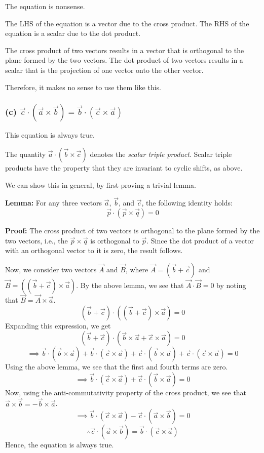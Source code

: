 The equation is nonsense.

The LHS of the equation is a vector due to the cross product.
The RHS of the equation is a scalar due to the dot product.

The cross product of two vectors results in a vector that is orthogonal to the plane formed by the two vectors.
The dot product of two vectors results in a scalar that is the projection of one vector onto the other vector.

Therefore, it makes no sense to use them like this.

\subsubsection*{(c) \( \vec{c} \cdot (\vec{a} \times \vec{b}) = \vec{b} \cdot (\vec{c} \times \vec{a}) \)}

This equation is always true.

The quantity \( \vec{a} \cdot (\vec{b} \times \vec{c}) \) denotes the \textit{scalar triple product}.
Scalar triple products have the property that they are invariant to cyclic shifts, as above.

We can show this in general, by first proving a trivial lemma.

\textbf{Lemma:} For any three vectors \( \vec{a} \), \( \vec{b} \), and \( \vec{c} \), the following identity holds:
\begin{equation*}
    \vec{p} \cdot (\vec{p} \times \vec{q}) = 0
\end{equation*}

\textbf{Proof:}
The cross product of two vectors is orthogonal to the plane formed by the two vectors, i.e., the \( \vec{p} \times \vec{q} \) is orthogonal to \( \vec{p} \).
Since the dot product of a vector with an orthogonal vector to it is zero, the result follows.

Now, we consider two vectors \( \vec{A} \) and \( \vec{B} \), where \( \vec{A} = (\vec{b} + \vec{c}) \) and \( \vec{B} = ((\vec{b} + \vec{c}) \times \vec{a}) \).
By the above lemma, we see that \( \vec{A} \cdot \vec{B} = 0 \) by noting that \( \vec{B} = \vec{A} \times \vec{a} \).
\begin{equation*}
    (\vec{b} + \vec{c}) \cdot ((\vec{b} + \vec{c}) \times \vec{a}) = 0
\end{equation*}
Expanding this expression, we get
\[
    (\vec{b} + \vec{c}) \cdot (\vec{b} \times \vec{a} + \vec{c} \times \vec{a}) = 0
\]
\[
    \implies \vec{b} \cdot (\vec{b} \times \vec{a}) + \vec{b} \cdot (\vec{c} \times \vec{a}) + \vec{c} \cdot (\vec{b} \times \vec{a}) + \vec{c} \cdot (\vec{c} \times \vec{a}) = 0
\]
Using the above lemma, we see that the first and fourth terms are zero.
\[
    \implies \vec{b} \cdot (\vec{c} \times \vec{a}) + \vec{c} \cdot (\vec{b} \times \vec{a}) = 0
\]
Now, using the anti-commutativity property of the cross product, we see that \( \vec{a} \times \vec{b} = -\vec{b} \times \vec{a} \).
\[
    \implies \vec{b} \cdot (\vec{c} \times \vec{a}) - \vec{c} \cdot (\vec{a} \times \vec{b}) = 0
\]
\[
    \therefore \vec{c} \cdot (\vec{a} \times \vec{b}) = \vec{b} \cdot (\vec{c} \times \vec{a})
\]
Hence, the equation is always true.

